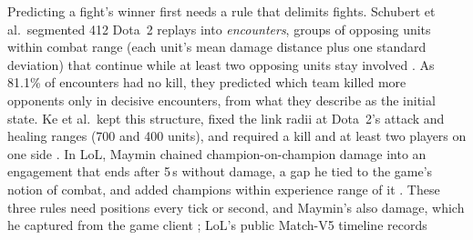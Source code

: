 Predicting a fight's winner first needs a rule that delimits fights. Schubert et al.\ segmented 412
Dota~2 replays into \emph{encounters}, groups of opposing units within combat range (each unit's mean
damage distance plus one standard deviation) that continue while at least two opposing units stay
involved \cite{schubert2016encounter}. As 81.1\% of encounters had no kill, they predicted which team
killed more opponents only in decisive encounters, from what they describe as the initial state.
Ke et al.\ kept this structure, fixed the link radii at Dota~2's attack and healing ranges (700
and 400 units), and required a kill and at least two players on one side \cite{ke2022}. In LoL, Maymin
chained champion-on-champion damage into an engagement that ends after 5\,s without damage, a gap he
tied to the game's notion of combat, and added champions within experience range of it
\cite{maymin2021smart}.
These three rules need positions every tick or second, and Maymin's also damage, which he captured
from the game client \cite{maymin2021smart}; LoL's public Match-V5 timeline \cite{riotapi2024timeline} records
